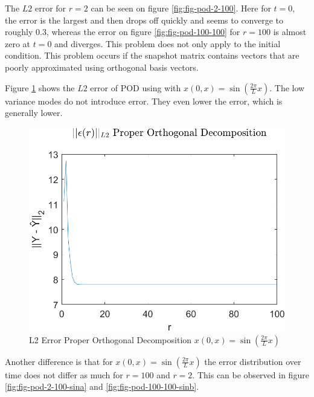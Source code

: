 The \(L2\) error for \(r=2\) can be seen on figure \ref{fig:fig-pod-2-100}.
Here for \(t=0\), the error is the largest and then drops off quickly and seems to converge to roughly 0.3, whereas the error on figure \ref{fig:fig-pod-100-100} for \(r=100\) is almost zero at \(t=0\) and diverges.
This problem does not only apply to the initial condition. This problem occurs if the snapshot matrix contains  vectors that are poorly approximated using orthogonal basis vectors.

Figure \ref{FIG-ERR-POD-SIN} shows the $L2$ error of POD using with $x(0, x) = \sin(\frac{2\pi}{L}x)$.
The low variance modes do not introduce error. 
They even lower the error, which is generally lower.
\begin{figure}[H]
\centering
\includegraphics[width=12.5cm]{images/L2_POD_SIN}
\caption{L2 Error Proper Orthogonal Decomposition $x(0, x) = \sin(\frac{2\pi}{L}x)$}
\label{FIG-ERR-POD-SIN}
\end{figure}
Another difference is that for $x(0, x) = \sin(\frac{2\pi}{L}x)$ the error distribution over time does not differ as much for \(r=100\) and \(r=2\).
This can be observed in figure \ref{fig:fig-pod-2-100-sina} and \ref{fig:fig-pod-100-100-sinb}.
